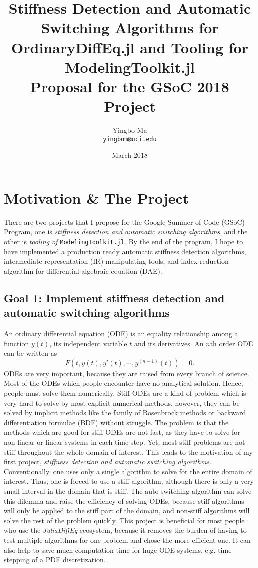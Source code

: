 \documentclass[12pt]{article}
\author{Yingbo Ma\\ \tt{yingbom@uci.edu}}
\date{March 2018}
\title{Stiffness Detection and Automatic Switching Algorithms for
OrdinaryDiffEq.jl and Tooling for ModelingToolkit.jl \\
\large{Proposal for the GSoC 2018 Project}}
\begin{document}
\maketitle
\tableofcontents

\section{Motivation \& The Project}
There are two projects that I propose for the Google Summer of Code (GSoC)
Program, one is \textit{stiffness detection and automatic switching
algorithms}, and the other is \textit{tooling of} \texttt{ModelingToolkit.jl}. By
the end of the program, I hope to have implemented a production ready automatic
stiffness detection algorithms, intermediate representation (IR) manipulating
tools, and index reduction algorithm for differential algebraic equation (DAE).

\subsection{Goal 1: Implement stiffness detection and automatic switching
algorithms} \label{goal1}
An ordinary differential equation (ODE) is an equality relationship among a
function $y(t)$, its independent variable $t$ and its derivatives. An $n$th
order ODE can be written as
\begin{equation}
  F(t, y(t), y'(t), \cdots, y^{(n-1)}(t)) = 0.
\end{equation}
ODEs are very important, because they are raised from every branch of science.
Most of the ODEs which people encounter have no analytical solution. Hence,
people must solve them numerically. Stiff ODEs are a kind of problem which is
very hard to solve by most explicit numerical methods, however, they can be
solved by implicit methods like the family of Rosenbrock methods or backward
differentiation formulae (BDF) without struggle. The problem is that the
methods which are good for stiff ODEs are not fast, as they have to solve for
non-linear or linear systems in each time step. Yet, most stiff problems are
not stiff throughout the whole domain of interest. This leads to the motivation
of my first project, \textit{stiffness detection and automatic switching
algorithms}. Conventionally, one uses only a single algorithm to solve for the
entire domain of interest. Thus, one is forced to use a stiff algorithm,
although there is only a very small interval in the domain that is stiff. The
auto-switching algorithm can solve this dilemma and raise the efficiency of
solving ODEs, because stiff algorithms will only be applied to the stiff part
of the domain, and non-stiff algorithms will solve the rest of the problem
quickly. This project is beneficial for most people who use the
\textit{JuliaDiffEq} ecosystem, because it removes the burden of having to test
multiple algorithms for one problem and chose the more efficient one. It can
also help to save much computation time for huge ODE systems, e.g. time
stepping of a PDE discretization.
\end{document}
